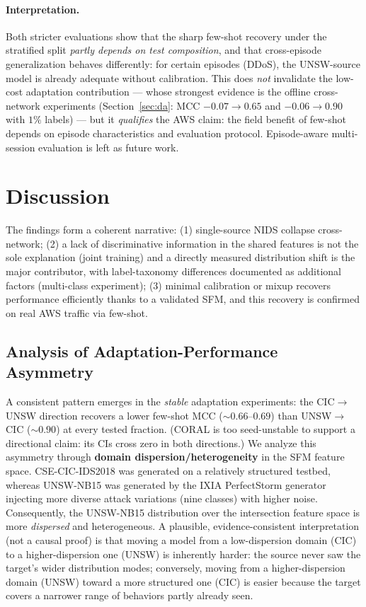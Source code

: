 \documentclass[preprint,12pt,authoryear]{elsarticle}
\begin{document}
\paragraph{Interpretation.} Both stricter evaluations show that the sharp few-shot
recovery under the stratified split \emph{partly depends on test composition}, and
that cross-episode generalization behaves differently: for certain episodes (DDoS),
the UNSW-source model is already adequate without calibration. This does \emph{not}
invalidate the low-cost adaptation contribution --- whose strongest evidence is the
offline cross-network experiments (Section~\ref{sec:da}: MCC $-0.07\to0.65$ and
$-0.06\to0.90$ with $1\%$ labels) --- but it \emph{qualifies} the AWS claim: the
field benefit of few-shot depends on episode characteristics and evaluation
protocol. Episode-aware multi-session evaluation is left as future work.

\section{Discussion}
\label{sec:discussion}

The findings form a coherent narrative: (1) single-source NIDS collapse
cross-network; (2) a lack of discriminative information in the shared features is
not the sole explanation (joint training) and a directly measured distribution
shift is the major contributor, with label-taxonomy differences documented as
additional factors (multi-class experiment);
(3) minimal calibration or mixup recovers performance efficiently thanks to a
validated SFM, and this recovery is confirmed on real AWS traffic via few-shot.

\subsection{Analysis of Adaptation-Performance Asymmetry}
\label{sec:asymmetry}
A consistent pattern emerges in the \emph{stable} adaptation experiments: the
CIC$\rightarrow$UNSW direction recovers a lower few-shot MCC ($\sim 0.66$--$0.69$)
than UNSW$\rightarrow$CIC ($\sim 0.90$) at every tested fraction. (CORAL is too
seed-unstable to support a directional claim: its CIs cross zero in both
directions.) We analyze this asymmetry through
\textbf{domain dispersion/heterogeneity} in the SFM feature space.
CSE-CIC-IDS2018 was generated on a relatively structured testbed, whereas
UNSW-NB15 was generated by the IXIA PerfectStorm generator injecting more diverse
attack variations (nine classes) with higher noise. Consequently, the UNSW-NB15
distribution over the intersection feature space is more \emph{dispersed} and
heterogeneous. A plausible, evidence-consistent interpretation (not a causal proof)
is that moving a model from a low-dispersion domain (CIC) to a higher-dispersion one
(UNSW) is inherently harder: the source never saw the target's wider distribution
modes; conversely, moving from a higher-dispersion domain (UNSW) toward a more
structured one (CIC) is easier because the target covers a narrower range of
behaviors partly already seen.
\end{document}
